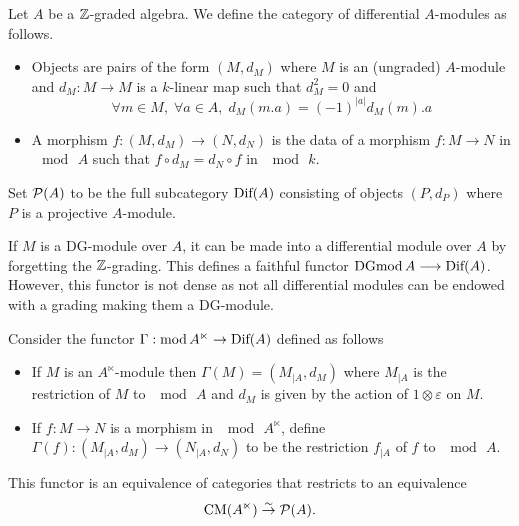 \documentclass[12pt]{article}
\begin{document}
	\begin{definition}
		\label{difmod}
		Let $A$ be a $\mathbb{Z}$-graded algebra.
		We define the category of differential $A$-modules as follows.
		\begin{itemize}
			\item Objects are pairs of the form $(M,d_M)$ where $M$ is an (ungraded) $A$-module and $d_M: M \to M$ is a $k$-linear map such that $d_M^2 = 0$ and
			\[\forall m \in M, \; \forall a \in A, \; d_M(m.a) = (-1)^{|a|} d_M(m).a\]
			\item A morphism $f: (M,d_M) \to (N,d_N)$ is the data of a morphism $f:M \to N$ in $\mod \, A$ such that $f \circ d_M = d_N \circ f$ in $\mod \, k$.
		\end{itemize}
		Set ${\cal{P}}(A)$ to be the full subcategory $\textup{Dif}(A)$ consisting of objects $(P,d_P)$ where $P$ is a projective $A$-module.
	\end{definition}
	
	\begin{remark}
		If $M$ is a DG-module over $A$, it can be made into a differential module over $A$ by forgetting the $\mathbb{Z}$-grading. This defines a faithful functor $\textup{DGmod} \, A \longrightarrow \textup{Dif}(A)$. However, this functor is not dense as not all differential modules can be endowed with a grading making them a DG-module.
	\end{remark}
	
	\begin{proposition}
		\label{equivDif}
		Consider the functor $\Gamma: \textup{mod} \, A^\ltimes \to \textup{Dif}(A)$ defined as follows
		\begin{itemize}
			\item If $M$ is an $A^\ltimes$-module then $\Gamma(M) = (M_{|A},d_M)$ where $M_{|A}$ is the restriction of $M$ to $\mod \, A$ and $d_M$ is given by the action of $1\otimes \varepsilon$ on $M$. 
			\item If $f: M \to N$ is a morphism in $\mod \, A^\ltimes$, define $\Gamma(f): (M_{|A},d_M) \to (N_{|A},d_N)$ to be the restriction $f_{|A}$ of $f$ to $\mod \, A$.
		\end{itemize}
		This functor is an equivalence of categories that restricts to an equivalence 
		\[\textup{CM}(A^\ltimes) \overset{\sim}{\to} {\cal{P}}(A).\]
	\end{proposition}
	
\end{document}

